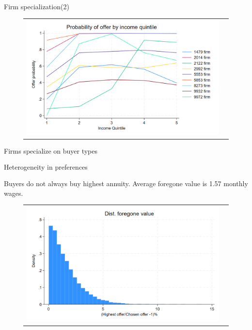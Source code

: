 \documentclass[10pt,aspectratio=169]{beamer}
\begin{document}

\begin{frame}{Firm specialization(2)}\label{slide:fig2}    

\begin{figure}[H]
\caption{}
\centering{}%
\begin{tabular}{cc}
\includegraphics[scale=0.24]{../figures/IE3_supply_offerprob_income_q(2).png}
\end{tabular}
\end{figure}

Firms specialize on buyer types
\hyperlink{slide:answer1}{}

\end{frame}


\begin{frame}{Heterogeneity in preferences}\label{slide:fig3}    

Buyers do not always buy highest annuity. Average foregone value is 1.57 monthly wages.

\begin{figure}[H]
\centering{}%
\begin{tabular}{cc}
\includegraphics[scale=0.25]{../figures/IE3_foregone_hist.png}
\end{tabular}
\end{figure}
\hyperlink{slide:answer1}{}

\end{frame}
\end{document}
